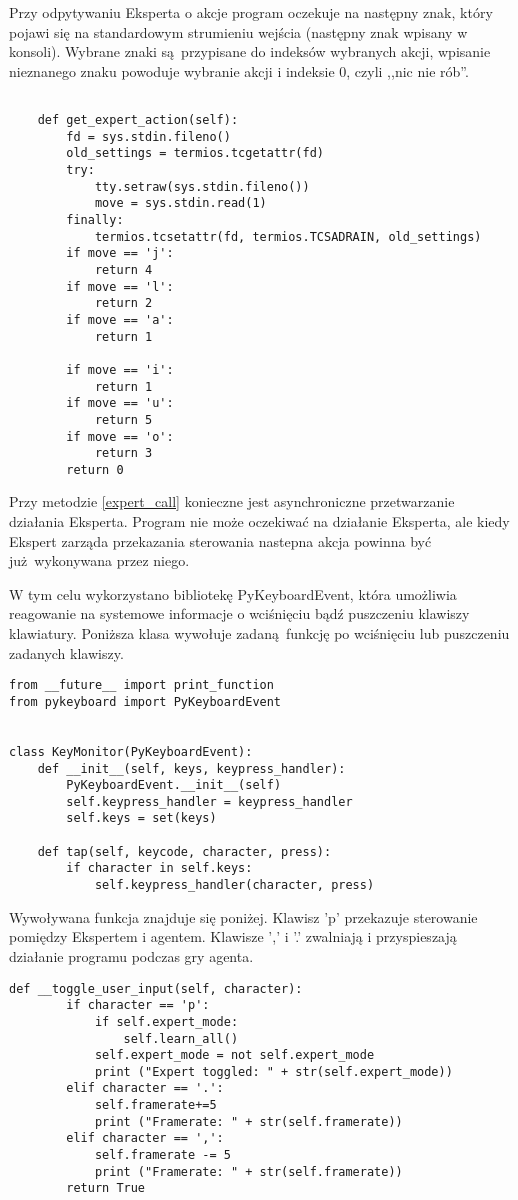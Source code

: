 Przy odpytywaniu Eksperta o akcje program oczekuje na następny znak, który pojawi się na standardowym strumieniu wejścia (następny znak wpisany w konsoli). Wybrane znaki są przypisane do indeksów wybranych akcji, wpisanie nieznanego znaku powoduje wybranie akcji i indeksie 0, czyli ,,nic nie rób''.

\begin{lstlisting}[language=iPython]

    def get_expert_action(self):
        fd = sys.stdin.fileno()
        old_settings = termios.tcgetattr(fd)
        try:
            tty.setraw(sys.stdin.fileno())
            move = sys.stdin.read(1)
        finally:
            termios.tcsetattr(fd, termios.TCSADRAIN, old_settings)
        if move == 'j':
            return 4
        if move == 'l':
            return 2
        if move == 'a':
            return 1

        if move == 'i':
            return 1
        if move == 'u':
            return 5
        if move == 'o':
            return 3
        return 0
\end{lstlisting}

Przy metodzie \ref{expert_call} konieczne jest asynchroniczne przetwarzanie działania Eksperta. Program nie może oczekiwać na działanie Eksperta, ale kiedy Ekspert zarząda przekazania sterowania nastepna akcja powinna być już wykonywana przez niego.

W tym celu wykorzystano bibliotekę PyKeyboardEvent, która umożliwia reagowanie na systemowe informacje o wciśnięciu bądź puszczeniu klawiszy klawiatury. Poniższa klasa wywołuje zadaną funkcję po wciśnięciu lub puszczeniu zadanych klawiszy.


\begin{lstlisting}[language=iPython]
from __future__ import print_function
from pykeyboard import PyKeyboardEvent


class KeyMonitor(PyKeyboardEvent):
    def __init__(self, keys, keypress_handler):
        PyKeyboardEvent.__init__(self)
        self.keypress_handler = keypress_handler
        self.keys = set(keys)

    def tap(self, keycode, character, press):
        if character in self.keys:
            self.keypress_handler(character, press)
\end{lstlisting}

Wywoływana funkcja znajduje się poniżej. Klawisz 'p' przekazuje sterowanie pomiędzy Ekspertem i agentem. Klawisze ',' i '.' zwalniają i przyspieszają działanie programu podczas gry agenta.

\begin{lstlisting}[language=iPython]
    def __toggle_user_input(self, character):
        if character == 'p':
            if self.expert_mode:
                self.learn_all()
            self.expert_mode = not self.expert_mode
            print ("Expert toggled: " + str(self.expert_mode))
        elif character == '.':
            self.framerate+=5
            print ("Framerate: " + str(self.framerate))
        elif character == ',':
            self.framerate -= 5
            print ("Framerate: " + str(self.framerate))
        return True
\end{lstlisting}
